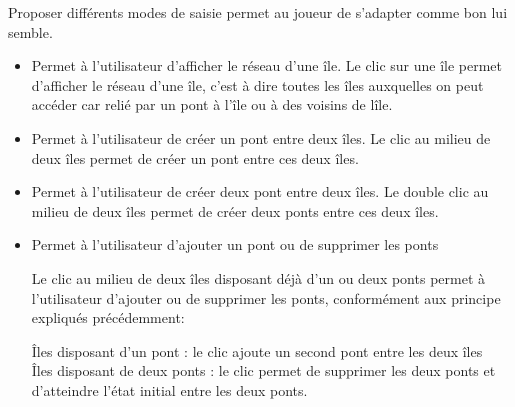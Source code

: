 \wPt\hspace{0.02cm}
{
    Proposer différents modes de saisie permet au joueur de s'adapter comme bon lui semble.
    \begin{itemize}
        \item {}
            {Permet à l'utilisateur d'afficher le réseau d'une île.}
            {
                Le clic sur une île permet d'afficher le réseau d'une île, c'est à dire toutes les îles auxquelles on peut accéder car relié par un pont à l’île ou à des voisins de lîle.
            }
        \item {}
            {Permet à l'utilisateur de créer un pont entre deux îles.}
            {
                Le clic au milieu de deux îles permet de créer un pont entre ces deux îles.
            }
        \item {}
            {Permet à l'utilisateur de créer deux pont entre deux îles.}
            {
                Le double clic au milieu de deux îles permet de créer deux ponts entre ces deux îles.
            }
        \item {}
            {Permet à l'utilisateur d'ajouter un pont ou de supprimer les ponts}
            {
                Le clic au milieu de deux îles disposant déjà d'un ou deux ponts permet à l'utilisateur d'ajouter ou de supprimer les ponts, conformément aux principe expliqués précédemment:

                Îles disposant d'un pont : le clic ajoute un second pont entre les deux îles \\
                Îles disposant de deux ponts : le clic permet de supprimer les deux ponts et d'atteindre l'état initial entre les deux ponts.
            }
    \end{itemize}
}
{

}
